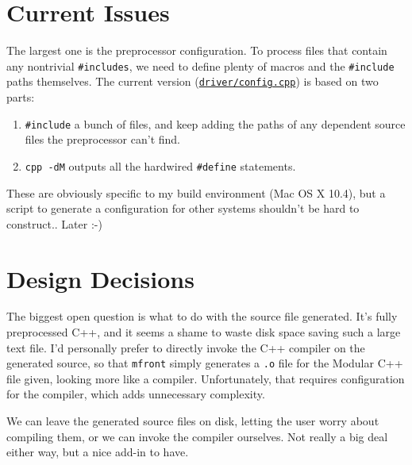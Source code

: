 \documentclass[leqno,fleqn, twocolumn]{article}
\begin{document}
\section{Current Issues}
The largest one is the preprocessor configuration.  To process files that contain any nontrivial \texttt{\#includes}, we need to define plenty of macros and the \texttt{\#include} paths themselves.  The current version (\href{https://boost-consulting.com:8443/trac/soc/browser/boost/soc/2006/modules/trunk/driver/config.cpp?rev=386}{\texttt{driver/config.cpp}}) is based on two parts:
\begin{enumerate}
\item \texttt{\#include} a bunch of files, and keep adding the paths of any dependent source files the preprocessor can't find.
\item \texttt{cpp -dM} outputs all the hardwired \texttt{\#define} statements. 
\end{enumerate}
These are obviously specific to my build environment (Mac OS X 10.4), but a script to generate a configuration for other systems shouldn't be hard to construct.. Later :-)


\section{Design Decisions}
The biggest open question is what to do with the source file generated.  It's fully preprocessed C++, and it seems a shame to waste disk space saving such a large text file.  I'd personally prefer to directly invoke the C++ compiler on the generated source, so that \texttt{mfront} simply generates a \texttt{.o} file for the Modular C++ file given, looking more like a compiler.  Unfortunately, that requires configuration for the compiler, which adds unnecessary complexity.

We can leave the generated source files on disk, letting the user worry about compiling them, or we can invoke the compiler ourselves.  Not really a big deal either way, but a nice add-in to have.
\end{document}
